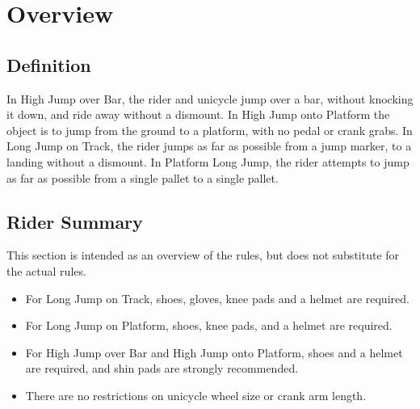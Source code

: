 \chapter{Overview}

\section{Definition}

In High Jump over Bar, the rider and unicycle jump over a bar, without knocking it down, and ride away without a dismount.
In High Jump onto Platform the object is to jump from the ground to a platform, with no pedal or crank grabs.
In Long Jump on Track, the rider jumps as far as possible from a jump marker, to a landing without a dismount.
In Platform Long Jump, the rider attempts to jump as far as possible from a single pallet to a single pallet.

\section{Rider Summary}

This section is intended as an overview of the rules, but does not substitute for the actual rules.
\begin{itemize}
  \item For Long Jump on Track, shoes, gloves, knee pads and a helmet are required.
  \item For Long Jump on Platform, shoes, knee pads, and a helmet are required.
  \item For High Jump over Bar and High Jump onto Platform, shoes and a helmet are required, and shin pads are strongly recommended.
  \item There are no restrictions on unicycle wheel size or crank arm length.
\end{itemize}
